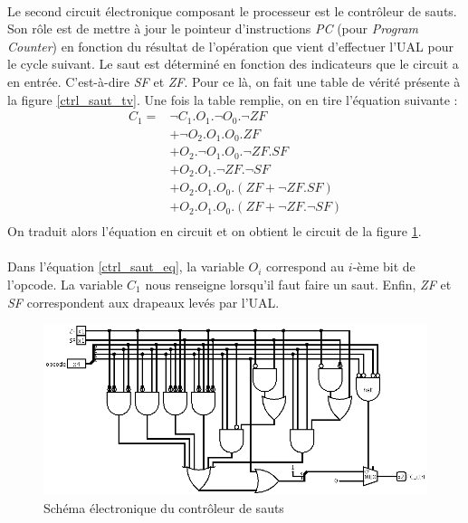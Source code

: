 \paragraph{}{
	Le second circuit électronique composant le processeur est
	le contrôleur de sauts. Son rôle est de mettre à jour le pointeur
	d'instructions \textit{PC} (pour \textit{Program Counter})
	en fonction du résultat de l'opération que vient d'effectuer
	l'UAL pour le cycle suivant. Le saut est déterminé en fonction
	des indicateurs que le circuit a en entrée. C'est-à-dire 
	\textit{SF} et \textit{ZF}. Pour ce là, on fait une table de
	vérité présente à la figure \ref{ctrl_saut_tv}. Une 
	fois la	table remplie, on en tire l'équation suivante :
	\begin{equation}
		\label{ctrl_saut_eq}
		\begin{split}
		C_{1} = & \neg C_{1} . O_{1} . \neg O_{0} . \neg{ZF} \\
				& + \neg O_{2} . O_{1} . O_{0} .  {ZF} \\
				& + O_{2} . \neg O_{1} . O_{0} . \neg{ZF} . {SF} \\
				& + O_{2} . O_{1} . \neg{ZF} . \neg{SF} \\
				& + O_{2} . O_{1} . O_{0} . ( {ZF} + \neg{ZF} . {SF}) \\
				& + O_{2} . O_{1} . O_{0} . ( {ZF} + \neg{ZF} . \neg{SF} ) \\
		\end{split}
	\end{equation}
	On traduit alors l'équation en circuit et on obtient le circuit
	de la figure \ref{control_saut_circ}.
}

\paragraph{}{
	Dans l'équation \ref{ctrl_saut_eq}, la variable $O_{i}$ correspond au $i$-ème
	bit de l'opcode. La variable $C_{1}$ nous renseigne lorsqu'il faut faire un saut.
	Enfin, \textit{ZF} et \textit{SF} correspondent aux drapeaux levés par l'UAL.
}

\begin{figure}
	\centering
	\includegraphics[scale=0.4,origin=c]{circuits/control_saut.png}
	\caption{
		\label{control_saut_circ}
		Sch\'{e}ma \'{e}lectronique du contr\^{o}leur de sauts
	}
\end{figure}

